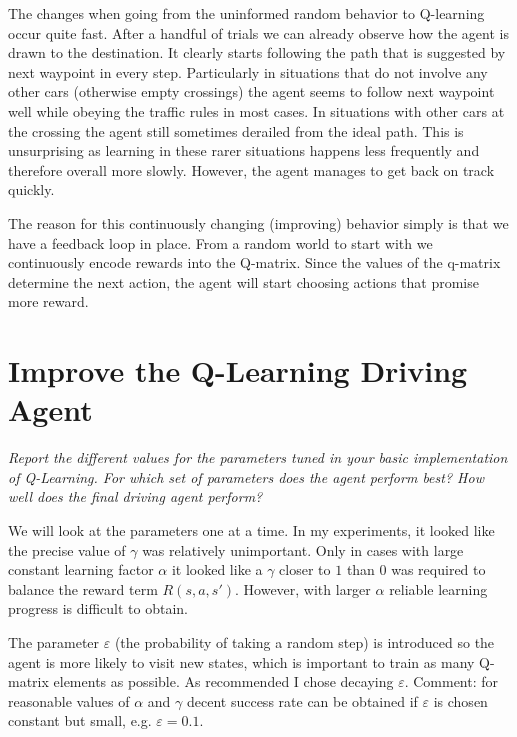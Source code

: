 \documentclass[a4paper,11pt]{article}
\numberwithin{equation}{section}
\numberwithin{figure}{section}
\begin{document}
The changes when going from the uninformed random behavior to Q-learning occur quite fast. After a handful of trials we can already observe how the agent is drawn to the destination. It clearly starts following the path that is suggested by next waypoint in every step. Particularly in situations that do not involve any other cars (otherwise empty crossings) the agent seems to follow next waypoint well while obeying the traffic rules in most cases. In situations with other cars at the crossing the agent still sometimes derailed from the ideal path. This is unsurprising as learning in these rarer situations happens less frequently and therefore overall more slowly. However, the agent manages to get back on track quickly.

The reason for this continuously changing (improving) behavior simply is that we have a feedback loop in place. From a random world to start with we continuously encode rewards into the Q-matrix. Since the values of the q-matrix determine the next action, the agent will start choosing actions that promise more reward.

\section*{\sffamily Improve the Q-Learning Driving Agent}
\textit{Report the different values for the parameters tuned in your basic implementation of Q-Learning. For which set of parameters does the agent perform best? How well does the final driving agent perform?}

We will look at the parameters one at a time. In my experiments, it looked like the precise value of $\gamma$ was relatively unimportant. Only in cases with large constant learning factor $\alpha$ it looked like a $\gamma$ closer to $1$ than $0$ was required to balance the reward term $R(s,a,s')$. However, with larger $\alpha$ reliable learning progress is difficult to obtain.

The parameter $\varepsilon$ (the probability of taking a random step) is introduced so the agent is more likely to visit new states, which is important to train as many Q-matrix elements as possible. As recommended I chose decaying $\varepsilon$. Comment: for reasonable values of $\alpha$ and $\gamma$ decent success rate can be obtained if $\varepsilon$ is chosen constant but small, e.g. $\varepsilon=0.1$.
\end{document}
